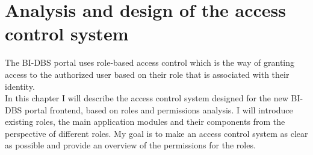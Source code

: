 \chapter{Analysis and design of the access control system} The BI-DBS portal uses role-based access control which is the way of granting access to the authorized user based on their role  that is associated with their identity. \cite{role-auth}\\ 
In this chapter I will describe the access control system designed for the new BI-DBS portal frontend, based on roles and permissions analysis. I will introduce existing roles, the main application modules and their components from the perspective of different roles. My goal is to make an access control system as clear as possible and provide an overview of the permissions for the roles.








